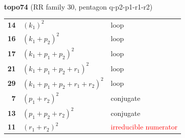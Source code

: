 \documentclass[10pt]{article}
\begin{document}
\begin{minipage}[t]{0.48\textwidth}
{}\\[2mm]\textbf{topo74} (RR family 30, pentagon q-p2-p1-r1-r2)\\[2pt]{\footnotesize\begin{tabular}{@{}r@{\ \ }l@{\ \ }l@{}}\textbf{14} & $(k_1)^2$ & loop\\
\textbf{16} & $(k_1+p_2)^2$ & loop\\
\textbf{17} & $(k_1+p_1+p_2)^2$ & loop\\
\textbf{21} & $(k_1+p_1+p_2+r_1)^2$ & loop\\
\textbf{29} & $(k_1+p_1+p_2+r_1+r_2)^2$ & loop\\
\textbf{7} & $(p_1+r_2)^2$ & conjugate\\
\textbf{13} & $(p_1+p_2+r_2)^2$ & conjugate\\
\textbf{11} & $(r_1+r_2)^2$ & \textcolor{red}{irreducible numerator}\\\end{tabular}}\end{minipage}

\bigskip
\end{document}

